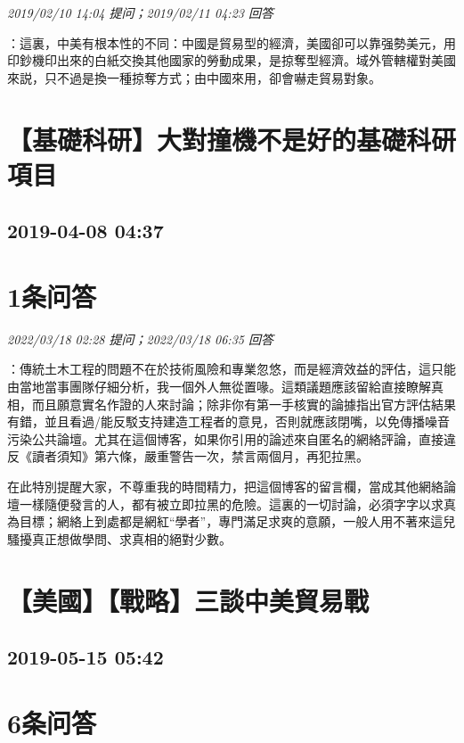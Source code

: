 \documentclass[twocolumn]{ctexart}
\begin{document}
\textit{\hfill\noindent\small 2019/02/10 14:04 提问；2019/02/11 04:23 回答}

：這裏，中美有根本性的不同：中國是貿易型的經濟，美國卻可以靠强勢美元，用印鈔機印出來的白紙交換其他國家的勞動成果，是掠奪型經濟。域外管轄權對美國來説，只不過是換一種掠奪方式；由中國來用，卻會嚇走貿易對象。
\\


\section{【基礎科研】大對撞機不是好的基礎科研項目}
\subsection{2019-04-08 04:37}


\section{1条问答}

\textit{\hfill\noindent\small 2022/03/18 02:28 提问；2022/03/18 06:35 回答}

：傳統土木工程的問題不在於技術風險和專業忽悠，而是經濟效益的評估，這只能由當地當事團隊仔細分析，我一個外人無從置喙。這類議題應該留給直接瞭解真相，而且願意實名作證的人來討論；除非你有第一手核實的論據指出官方評估結果有錯，並且看過/能反駁支持建造工程者的意見，否則就應該閉嘴，以免傳播噪音污染公共論壇。尤其在這個博客，如果你引用的論述來自匿名的網絡評論，直接違反《讀者須知》第六條，嚴重警告一次，禁言兩個月，再犯拉黑。


在此特別提醒大家，不尊重我的時間精力，把這個博客的留言欄，當成其他網絡論壇一樣隨便發言的人，都有被立即拉黑的危險。這裏的一切討論，必須字字以求真為目標；網絡上到處都是網紅“學者”，專門滿足求爽的意願，一般人用不著來這兒騷擾真正想做學問、求真相的絕對少數。
\\


\section{【美國】【戰略】三談中美貿易戰}
\subsection{2019-05-15 05:42}


\section{6条问答}
\end{document}
